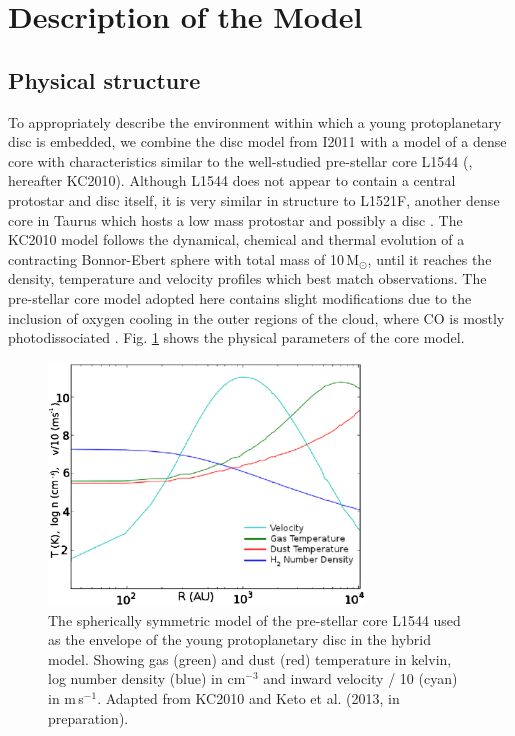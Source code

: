 \documentclass[useAMS,usenatbib]{mn2e}
\begin{document}
\section{Description of the Model} \label{sec:description_model}

\subsection{Physical structure} \label{subsec:physical_structure}

To appropriately describe the environment within which a young protoplanetary disc is embedded, we combine the disc model from I2011 with a model of a dense core with characteristics similar to the well-studied pre-stellar core L1544 (\citealt{Keto2010}, hereafter KC2010). Although L1544 does not appear to contain a central protostar and disc itself, it is very similar in structure to L1521F,  another dense core in Taurus which hosts a low mass protostar and possibly a disc \citep{Bourke2006}. The KC2010 model follows the dynamical, chemical and thermal evolution of a contracting Bonnor-Ebert sphere \citep{Bonnor1956,Ebert1957} with total mass of 10\,M$_{\odot}$, until it reaches the density, temperature and velocity profiles which best match observations. The pre-stellar core model adopted here contains slight modifications due to the inclusion of oxygen cooling in the outer regions of the cloud, where CO is mostly photodissociated \citep{Caselli2012}. Fig. \ref{fig:l1544_model} shows the physical parameters of the core model. \smallskip

\begin{figure}
 \includegraphics[width=84mm]{Figures/model/L1544model_used_legend_small2.eps}
 \caption{The spherically symmetric model of the pre-stellar core L1544 used as the envelope of the young protoplanetary disc in the hybrid model. Showing gas (green) and dust (red) temperature in kelvin, log number density (blue) in cm$^{-3}$ and inward velocity / 10 (cyan) in m$\,$s$^{-1}$. Adapted from KC2010 and Keto et al. (2013, in preparation).}
 \label{fig:l1544_model}
\end{figure}
\end{document}
